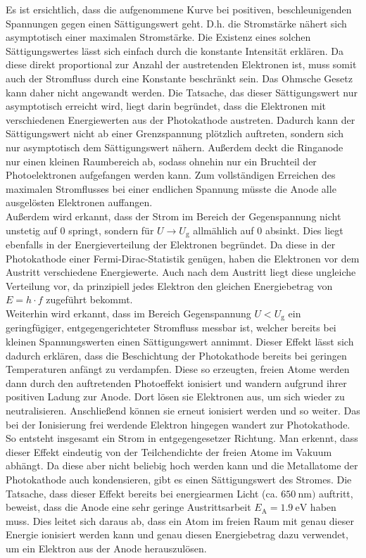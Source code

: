 Es ist ersichtlich, dass die aufgenommene Kurve bei positiven, beschleunigenden Spannungen 
gegen einen Sättigungswert geht. D.h. die Stromstärke nähert sich asymptotisch einer 
maximalen Stromstärke. Die Existenz eines solchen Sättigungswertes lässt sich einfach 
durch die konstante Intensität erklären. Da diese direkt proportional zur Anzahl der 
austretenden Elektronen ist, muss somit auch der Stromfluss durch eine Konstante 
beschränkt sein. Das Ohmsche Gesetz kann daher nicht angewandt werden. Die Tatsache, 
das dieser Sättigungswert nur asymptotisch erreicht wird, liegt darin begründet, dass 
die Elektronen mit verschiedenen Energiewerten aus der Photokathode austreten. Dadurch 
kann der Sättigungswert nicht ab einer Grenzspannung plötzlich auftreten, sondern sich 
nur asymptotisch dem Sättigungswert nähern. Außerdem deckt die Ringanode nur einen kleinen
Raumbereich ab, sodass ohnehin nur ein Bruchteil der Photoelektronen aufgefangen werden kann. 
Zum vollständigen Erreichen des maximalen Stromflusses bei einer endlichen Spannung müsste 
die Anode alle ausgelösten Elektronen auffangen. \\
Außerdem wird erkannt, dass der Strom im Bereich der Gegenspannung nicht unstetig auf 0 
springt, sondern für $U\rightarrow U_\text{g}$ allmählich auf 0 absinkt. Dies liegt ebenfalls 
in der Energieverteilung der Elektronen begründet. Da diese in der Photokathode einer 
Fermi-Dirac-Statistik genügen, haben die Elektronen vor dem Austritt verschiedene Energiewerte. 
Auch nach dem Austritt liegt diese ungleiche Verteilung vor, da prinzipiell jedes Elektron 
den gleichen Energiebetrag von $E=h\cdot f$ zugeführt bekommt.\\
Weiterhin wird erkannt, dass im Bereich Gegenspannung $U < U_\text{g}$ ein geringfügiger, 
entgegengerichteter Stromfluss messbar ist, welcher bereits bei kleinen Spannungswerten 
einen Sättigungswert annimmt. Dieser Effekt lässt sich dadurch erklären, dass die 
Beschichtung der Photokathode bereits bei geringen Temperaturen anfängt zu verdampfen. 
Diese so erzeugten, freien Atome werden dann durch den auftretenden Photoeffekt ionisiert
und wandern aufgrund ihrer positiven Ladung zur Anode. Dort lösen sie Elektronen aus, um sich 
wieder zu neutralisieren. Anschließend können sie erneut ionisiert werden und so weiter. Das bei 
der Ionisierung frei werdende Elektron hingegen wandert zur Photokathode. So entsteht insgesamt 
ein Strom in entgegengesetzer Richtung. Man erkennt, dass dieser Effekt eindeutig von der 
Teilchendichte der freien Atome im Vakuum abhängt. Da diese aber nicht beliebig hoch werden kann und 
die Metallatome der Photokathode auch kondensieren, gibt es einen Sättigungswert des Stromes. Die 
Tatsache, dass dieser Effekt bereits bei energiearmen Licht (ca. $\SI{650}{\nano\meter})$ auftritt, 
beweist, dass die Anode eine sehr geringe Austrittsarbeit $E_\text{A} = \SI{1.9}{\eV}$ haben muss. 
Dies leitet sich daraus ab, dass ein Atom im freien Raum mit genau dieser Energie ionisiert werden 
kann und genau diesen Energiebetrag dazu verwendet, um ein Elektron aus der Anode herauszulösen. 